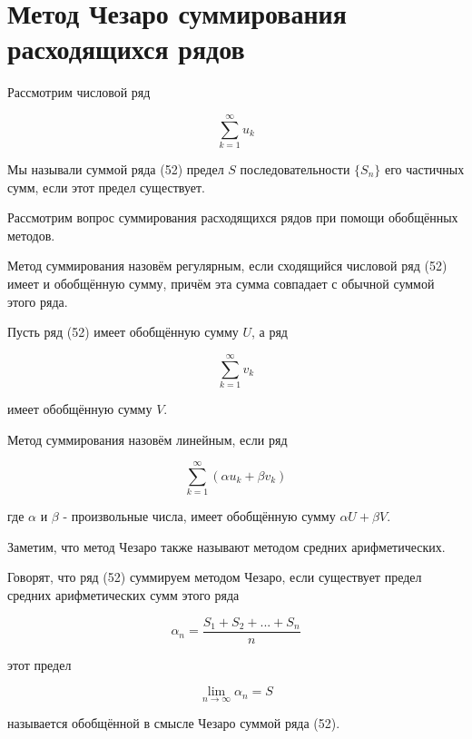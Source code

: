 \section{Метод Чезаро суммирования расходящихся рядов}

Рассмотрим числовой ряд

\begin{equation}
	\displaystyle\sum_{k = 1}^\infty u_k
\end{equation}

Мы называли суммой ряда (52) предел $S$ последовательности $\{S_n\}$ его частичных сумм, если этот предел существует.

Рассмотрим вопрос суммирования расходящихся рядов при помощи обобщённых методов.

\begin{definition}
	Метод суммирования назовём регулярным, если сходящийся числовой ряд (52) имеет и обобщённую сумму, причём эта сумма совпадает с обычной суммой этого ряда.
\end{definition}

Пусть ряд (52) имеет обобщённую сумму $U$, а ряд

\begin{equation}
	\displaystyle\sum_{k = 1}^\infty v_k
\end{equation}

имеет обобщённую сумму $V$.

\begin{definition}
	Метод суммирования назовём линейным, если ряд
	
	\begin{equation}
		\displaystyle\sum_{k = 1}^\infty (\alpha u_k + \beta v_k)
	\end{equation}
	
	где $\alpha$ и $\beta$ - произвольные числа, имеет обобщённую сумму $\alpha U + \beta V$.
\end{definition}

Заметим, что метод Чезаро также называют методом средних арифметических.

\begin{definition}
	Говорят, что ряд (52) суммируем методом Чезаро, если существует предел средних арифметических сумм этого ряда
	
	\begin{equation*}
		\alpha_n = \frac{S_1 + S_2 + ... + S_n}{n}
	\end{equation*}
	
	этот предел
	
	\begin{equation}
		\displaystyle\lim_{n \rightarrow \infty} \alpha_n = S
	\end{equation}
	
	называется обобщённой в смысле Чезаро суммой ряда (52).
\end{definition}


